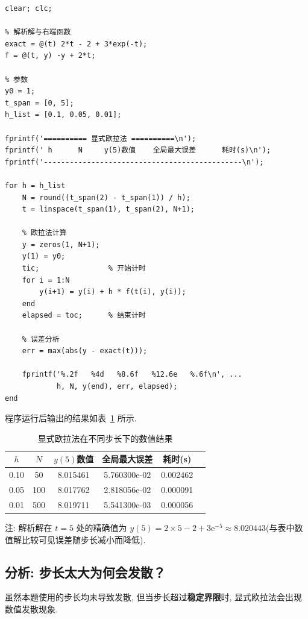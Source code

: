 \documentclass[12pt,a4paper]{ctexart}
\begin{document}
\begin{lstlisting}[caption={显式欧拉法求解程序}]
% 显式欧拉法: 求解 y' = -y + 2t, y(0)=1, t∈[0,5]
clear; clc;

% 解析解与右端函数
exact = @(t) 2*t - 2 + 3*exp(-t);
f = @(t, y) -y + 2*t;

% 参数
y0 = 1;
t_span = [0, 5];
h_list = [0.1, 0.05, 0.01];

fprintf('========== 显式欧拉法 ==========\n');
fprintf(' h      N     y(5)数值    全局最大误差      耗时(s)\n');
fprintf('----------------------------------------------\n');

for h = h_list
    N = round((t_span(2) - t_span(1)) / h);
    t = linspace(t_span(1), t_span(2), N+1);
    
    % 欧拉法计算
    y = zeros(1, N+1);
    y(1) = y0;
    tic;                % 开始计时
    for i = 1:N
        y(i+1) = y(i) + h * f(t(i), y(i));
    end
    elapsed = toc;      % 结束计时
    
    % 误差分析
    err = max(abs(y - exact(t)));
    
    fprintf('%.2f   %4d   %8.6f   %12.6e   %.6f\n', ...
            h, N, y(end), err, elapsed);
end
\end{lstlisting}

程序运行后输出的结果如表~\ref{tab:euler_results} 所示. 
\begin{table}[htbp]
    \centering
    \caption{显式欧拉法在不同步长下的数值结果}
    \label{tab:euler_results}
    \begin{tabular}{@{}cccccc@{}}
        \toprule
        $h$ & $N$ & $y(5)$数值 & 全局最大误差 & 耗时(s) \\
        \midrule
        0.10 & 50  & 8.015461 & 5.760300e-02 & 0.002462 \\
        0.05 & 100 & 8.017762 & 2.818056e-02 & 0.000091 \\
        0.01 & 500 & 8.019711 & 5.541300e-03 & 0.000056 \\
        \bottomrule
    \end{tabular}
\end{table}

注: 解析解在 $t=5$ 处的精确值为 $y(5) = 2\times5 - 2 + 3\mathrm{e}^{-5} \approx 8.020443$(与表中数值解比较可见误差随步长减小而降低). 

\subsection{分析: 步长太大为何会发散？}
虽然本题使用的步长均未导致发散, 但当步长超过\textbf{稳定界限}时, 显式欧拉法会出现数值发散现象. 
\end{document}

